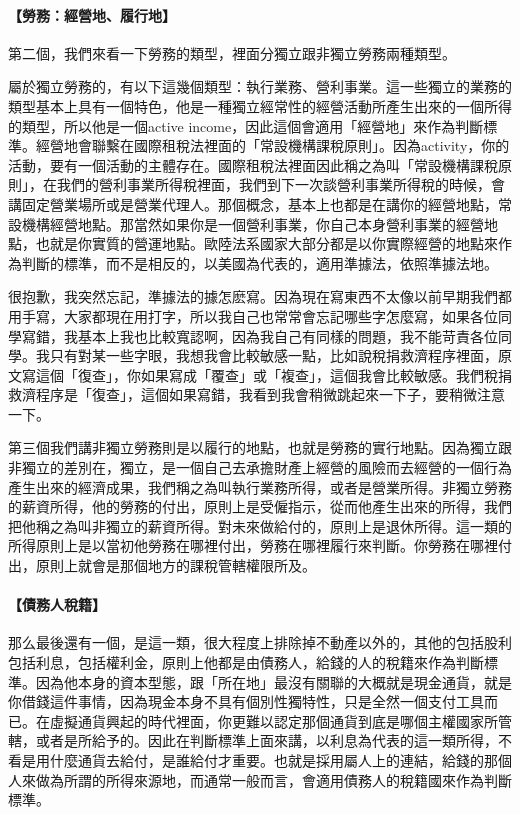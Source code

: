 \documentclass[oneside,sub3section]{ctexbook}
\let\oldparagraph\paragraph
\renewcommand{\paragraph}[1]{\oldparagraph{#1}\mbox{}}
\begin{document}
\hypertarget{ux52deux52d9ux7d93ux71dfux5730ux5c65ux884cux5730}{%
\paragraph{【勞務：經營地、履行地】}\label{ux52deux52d9ux7d93ux71dfux5730ux5c65ux884cux5730}}

第二個，我們來看一下勞務的類型，裡面分獨立跟非獨立勞務兩種類型。

屬於獨立勞務的，有以下這幾個類型：執行業務、營利事業。這一些獨立的業務的類型基本上具有一個特色，他是一種獨立經常性的經營活動所產生出來的一個所得的類型，所以他是一個active income，因此這個會適用「經營地」來作為判斷標準。經營地會聯繫在國際租稅法裡面的「常設機構課稅原則」。因為activity，你的活動，要有一個活動的主體存在。國際租稅法裡面因此稱之為叫「常設機構課稅原則」，在我們的營利事業所得稅裡面，我們到下一次談營利事業所得稅的時候，會講固定營業場所或是營業代理人。那個概念，基本上也都是在講你的經營地點，常設機構經營地點。那當然如果你是一個營利事業，你自己本身營利事業的經營地點，也就是你實質的營運地點。歐陸法系國家大部分都是以你實際經營的地點來作為判斷的標準，而不是相反的，以美國為代表的，適用準據法，依照準據法地。

很抱歉，我突然忘記，準據法的據怎麽寫。因為現在寫東西不太像以前早期我們都用手寫，大家都現在用打字，所以我自己也常常會忘記哪些字怎麼寫，如果各位同學寫錯，我基本上我也比較寬認啊，因為我自己有同樣的問題，我不能苛責各位同學。我只有對某一些字眼，我想我會比較敏感一點，比如說稅捐救濟程序裡面，原文寫這個「復查」，你如果寫成「覆查」或「複查」，這個我會比較敏感。我們稅捐救濟程序是「復查」，這個如果寫錯，我看到我會稍微跳起來一下子，要稍微注意一下。

第三個我們講非獨立勞務則是以履行的地點，也就是勞務的實行地點。因為獨立跟非獨立的差別在，獨立，是一個自己去承擔財產上經營的風險而去經營的一個行為產生出來的經濟成果，我們稱之為叫執行業務所得，或者是營業所得。非獨立勞務的薪資所得，他的勞務的付出，原則上是受僱指示，從而他產生出來的所得，我們把他稱之為叫非獨立的薪資所得。對未來做給付的，原則上是退休所得。這一類的所得原則上是以當初他勞務在哪裡付出，勞務在哪裡履行來判斷。你勞務在哪裡付出，原則上就會是那個地方的課稅管轄權限所及。

\hypertarget{ux50b5ux52d9ux4ebaux7a05ux7c4d}{%
\paragraph{【債務人稅籍】}\label{ux50b5ux52d9ux4ebaux7a05ux7c4d}}

那么最後還有一個，是這一類，很大程度上排除掉不動產以外的，其他的包括股利包括利息，包括權利金，原則上他都是由債務人，給錢的人的稅籍來作為判斷標準。因為他本身的資本型態，跟「所在地」最沒有關聯的大概就是現金通貨，就是你借錢這件事情，因為現金本身不具有個別性獨特性，只是全然一個支付工具而已。在虛擬通貨興起的時代裡面，你更難以認定那個通貨到底是哪個主權國家所管轄，或者是所給予的。因此在判斷標準上面來講，以利息為代表的這一類所得，不看是用什麼通貨去給付，是誰給付才重要。也就是採用屬人上的連結，給錢的那個人來做為所謂的所得來源地，而通常一般而言，會適用債務人的稅籍國來作為判斷標準。
\end{document}
